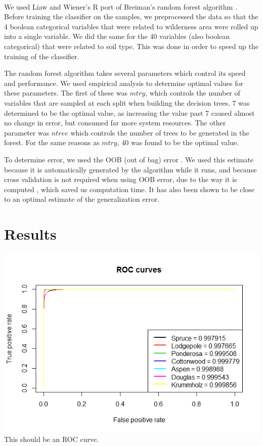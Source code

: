 \documentclass[11pt]{article}
\begin{document}
\paragraph{}
We used Liaw and Wiener's R port \cite{liaw02} of Breiman's random forest algorithm \cite{breiman01}. Before training the classifier on the samples, we preprocessed the data so that the 4 boolean categorical variables that were related to wilderness area were rolled up into a single variable. We did the same for the 40 variables (also boolean categorical) that were related to soil type. This was done in order to speed up the training of the classifier.
\par
The random forest algorithm takes several parameters which control its speed and performance. We used empirical analysis to determine optimal values for these parameters. The first of these was $mtry$, which controls the number of variables that are sampled at each split when building the decision trees. 7 was determined to be the optimal value, as increasing the value past 7 caused almost no change in error, but consumed far more system resources. The other parameter was $ntree$ which controls the number of trees to be generated in the forest. For the same reasons as $mtry$, 40 was found to be the optimal value.
\par
To determine error, we used the OOB (out of bag) error \cite{breiman96}. We used this estimate because it is automatically generated by the algorithm while it runs, and because cross validation is not required when using OOB error, due to the way it is computed \cite{breiman01, breiman96}, which saved us computation time. It has also been shown to be close to an optimal estimate of the generalization error\cite{breiman96}.

\section{Results}
\includegraphics[width=\linewidth]{images/RFROC.png}
This should be an ROC curve.
\end{document}
